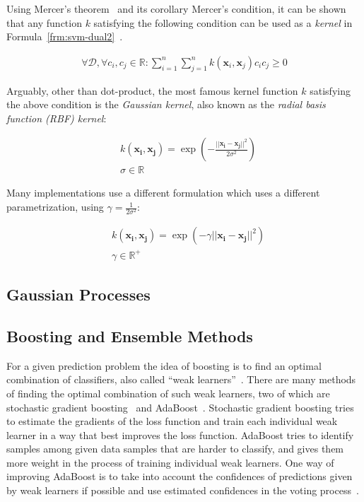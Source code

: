 Using Mercer's theorem~\cite{mercer-theorem} and its corollary Mercer's condition, it can be shown that any function $k$ satisfying the following condition can be used as a \emph{kernel} in Formula~\ref{frm:svm-dual2}~\cite[TODO:chapter]{learning-with-kernels}.

\begin{align}
  \forall \mathcal{D}, \forall c_i, c_j \in \mathbb{R}: \sum_{i=1}^n\sum_{j=1}^n k(\mathbf{x}_i, \mathbf{x}_j) c_i c_j \geq 0
  \label{frm:positive-definite}
\end{align}

Arguably, other than dot-product, the most famous kernel function $k$ satisfying the above condition is the \emph{Gaussian kernel}, also known as the \emph{radial basis function (RBF) kernel}:

\begin{align}
  &k(\mathbf{x_i}, \mathbf{x_j}) = \exp\left(-\frac{||\mathbf{x_i} - \mathbf{x_j}||^2}{2\sigma^2}\right) \nonumber \\
  &\sigma \in \mathbb{R}
  \label{frm:rbf-kernel1}
\end{align}

Many implementations use a different formulation which uses a different parametrization, using $\gamma=\frac{1}{2\sigma^2}$:

\begin{align}
  &k(\mathbf{x_i}, \mathbf{x_j}) = \exp\left(-\gamma||\mathbf{x_i} - \mathbf{x_j}||^2\right) \nonumber \\
  &\gamma \in \mathbb{R}^+
  \label{frm:rbf-kernel2}
\end{align}

\subsection{Gaussian Processes}

\subsection{Boosting and Ensemble Methods}
For a given prediction problem the idea of boosting is to find an optimal combination of classifiers, also called ``weak learners''~\cite{ensemble2002}. There are many methods of finding the optimal combination of such weak learners, two of which are stochastic gradient boosting~\cite{friedman2002stochastic} and AdaBoost~\cite{adaboost97}. Stochastic gradient boosting tries to estimate the gradients of the loss function and train each individual weak learner in a way that best improves the loss function. AdaBoost tries to identify samples among given data samples that are harder to classify, and gives them more weight in the process of training individual weak learners. One way of improving AdaBoost is to take into account the confidences of predictions given by weak learners if possible and use estimated confidences in the voting process~\cite{adaboost99improved}.

